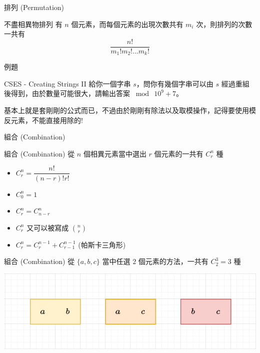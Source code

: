 \documentclass[aspectratio=169]{beamer}
\begin{document}
\begin{frame}{排列 (Permutation)}
    \begin{alertblock}{不盡相異物排列}
        有 $n$ 個元素，而每個元素的出現次數共有 $m_i$ 次，則排列的次數一共有
        $$\dfrac{n!}{m_1!m_2!\dots m_k!}$$
    \end{alertblock}
\end{frame}

\begin{frame}{例題}
    \begin{block}{CSES - Creating Strings II}
        給你一個字串 $s$，問你有幾個字串可以由 $s$ 經過重組後得到，由於數量可能很大，請輸出答案 $\bmod \ 10^9+7$。
    \end{block} \pause
    基本上就是套剛剛的公式而已，不過由於剛剛有除法以及取模操作，記得要使用模反元素，不能直接用除的!
\end{frame}

\begin{frame}{組合 (Combination)}
    \begin{alertblock}{組合 (Combination)}
        從 $n$ 個相異元素當中選出 $r$ 個元素的一共有 $C^n_r$ 種
        \begin{itemize}
            \item $C^n_r = \dfrac{n!}{(n-r)!r!}$
            \item $C^n_0 = 1$
            \item $C^n_r = C^n_{n-r}$
            \item $C^n_r$ 又可以被寫成 $\binom{n}{r}$
            \item $C^n_r = C^{n-1}_r + C^{n-1}_{r-1}$ (帕斯卡三角形)
        \end{itemize}
    \end{alertblock}
\end{frame}

\begin{frame}{組合 (Combination)}
    從 $\{a,b,c\}$ 當中任選 $2$ 個元素的方法，一共有 $C^3_2 = 3$ 種
    \begin{center}
        \includegraphics[width=\textwidth]{images/combination.png}
    \end{center}
\end{frame}
\end{document}
